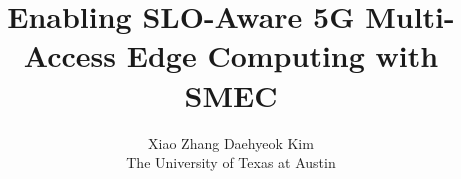 \documentclass[letterpaper,twocolumn,10pt]{article}
\begin{document}
\newcommand{\sys}{\mbox{{SMEC}}\xspace}
\newcommand{\dallas}{\mbox{{Dallas}}\xspace}
\newcommand{\nanjing}{\mbox{{Nanjing}}\xspace}
\newcommand{\seoul}{\mbox{{Seoul}}\xspace}
\newcommand{\tutti}{\mbox{{Tutti}}\xspace}
\newcommand{\arma}{\mbox{{ARMA}}\xspace}


\title{Enabling SLO-Aware 5G Multi-Access Edge Computing with \sys}

\author{
    {\rm Xiao Zhang  \quad Daehyeok Kim}\\
    The University of Texas at Austin\\
}

\maketitle
\frenchspacing

\pagestyle{empty}











\label{EndOfPaper}

{


}


\end{document}
